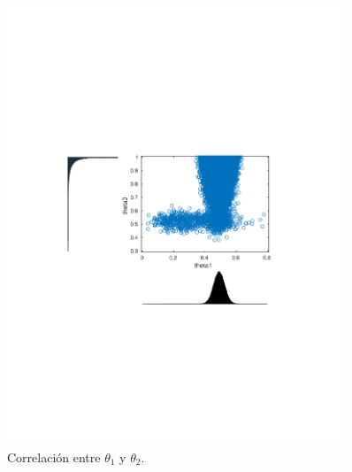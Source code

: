 \begin{figure}[H]
\begin{minipage}{0.5\textwidth}
	\includegraphics[width=0.9\textwidth]{imgs/theta1_3.png}
	\caption{\footnotesize Correlación entre $\theta_1$ y $\theta_2$.}
\end{minipage}
\end{figure}

